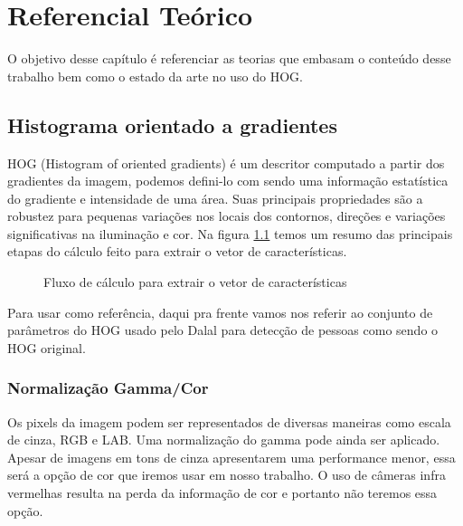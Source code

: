  \chapter{Referencial Teórico}

O objetivo desse capítulo é referenciar as teorias que embasam o conteúdo desse trabalho bem como o estado da arte no uso do HOG.

\section{Histograma orientado a gradientes}

HOG (Histogram of oriented gradients) é um descritor computado a partir dos gradientes da imagem, podemos defini-lo com sendo uma informação estatística do gradiente e intensidade de uma área. Suas principais propriedades são a robustez para pequenas variações nos locais dos contornos, direções e variações significativas na iluminação e cor. Na figura \ref{fig:hog} temos um resumo das principais etapas do cálculo feito para extrair o vetor de características.

\begin{figure}[ht!]
\centering
{}
  \caption{Fluxo de cálculo para extrair o vetor de características}
  \label{fig:hog}
\end{figure}

Para usar como referência, daqui pra frente vamos nos referir ao conjunto de parâmetros do HOG usado pelo Dalal \cite{dalal} para detecção de pessoas como sendo o HOG original.

\subsection{Normalização Gamma/Cor}

Os pixels da imagem podem ser representados de diversas maneiras como escala de cinza, RGB e LAB. Uma normalização do gamma pode ainda ser aplicado. 
Apesar de imagens em tons de cinza apresentarem uma performance menor, essa será a opção de cor que iremos usar em nosso trabalho. O uso de câmeras infra vermelhas resulta na perda da informação de cor e portanto não teremos essa opção.

